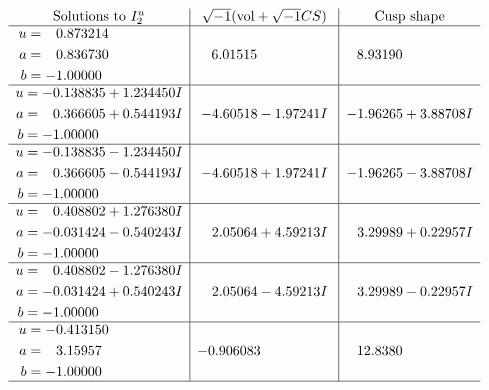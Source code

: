 \documentclass[1p]{elsarticle_modified}
\theoremstyle{definition}
\newcommand{\I}{\sqrt{-1}}
\begin{document}
$$\begin{array}{c|c|c}  
\text{Solutions to }I^u_{2}& \I (\text{vol} + \sqrt{-1}CS) & \text{Cusp shape}\\
 \hline 
\begin{aligned}
u &= \phantom{-}0.873214\phantom{ +0.000000I} \\
a &= \phantom{-}0.836730\phantom{ +0.000000I} \\
b &= -1.00000\phantom{ +0.000000I}\end{aligned}
 & \phantom{-}6.01515\phantom{ +0.000000I} & \phantom{-}8.93190\phantom{ +0.000000I} \\ \hline\begin{aligned}
u &= -0.138835 + 1.234450 I \\
a &= \phantom{-}0.366605 + 0.544193 I \\
b &= -1.00000\phantom{ +0.000000I}\end{aligned}
 & -4.60518 - 1.97241 I & -1.96265 + 3.88708 I \\ \hline\begin{aligned}
u &= -0.138835 - 1.234450 I \\
a &= \phantom{-}0.366605 - 0.544193 I \\
b &= -1.00000\phantom{ +0.000000I}\end{aligned}
 & -4.60518 + 1.97241 I & -1.96265 - 3.88708 I \\ \hline\begin{aligned}
u &= \phantom{-}0.408802 + 1.276380 I \\
a &= -0.031424 - 0.540243 I \\
b &= -1.00000\phantom{ +0.000000I}\end{aligned}
 & \phantom{-}2.05064 + 4.59213 I & \phantom{-}3.29989 + 0.22957 I \\ \hline\begin{aligned}
u &= \phantom{-}0.408802 - 1.276380 I \\
a &= -0.031424 + 0.540243 I \\
b &= -1.00000\phantom{ +0.000000I}\end{aligned}
 & \phantom{-}2.05064 - 4.59213 I & \phantom{-}3.29989 - 0.22957 I \\ \hline\begin{aligned}
u &= -0.413150\phantom{ +0.000000I} \\
a &= \phantom{-}3.15957\phantom{ +0.000000I} \\
b &= -1.00000\phantom{ +0.000000I}\end{aligned}
 & -0.906083\phantom{ +0.000000I} & \phantom{-}12.8380\phantom{ +0.000000I}\\
 \hline 
 \end{array}$$\newpage\newpage\renewcommand{\arraystretch}{1}
\end{document}
